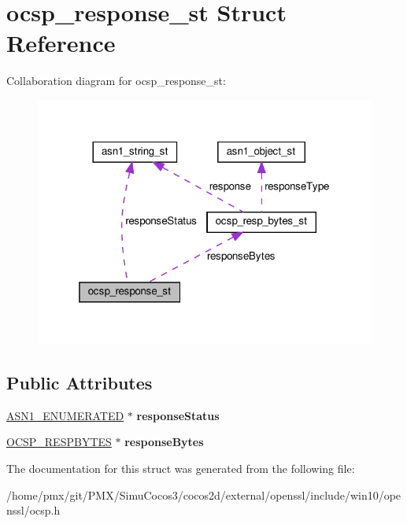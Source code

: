 \hypertarget{structocsp__response__st}{}\section{ocsp\+\_\+response\+\_\+st Struct Reference}
\label{structocsp__response__st}


Collaboration diagram for ocsp\+\_\+response\+\_\+st\+:
\nopagebreak
\begin{figure}[H]
\begin{center}
\leavevmode
\includegraphics[width=319pt]{structocsp__response__st__coll__graph}
\end{center}
\end{figure}
\subsection*{Public Attributes}
\begin{DoxyCompactItemize}
\item 
\mbox{\label{structocsp__response__st_a5c79d6dd4c93fb0946fc1e94467589fe}} 
\hyperlink{structasn1__string__st}{A\+S\+N1\+\_\+\+E\+N\+U\+M\+E\+R\+A\+T\+ED} $\ast$ {\bfseries response\+Status}
\item 
\mbox{\label{structocsp__response__st_a4724a80cc511a45789534e55588e5b9c}} 
\hyperlink{structocsp__resp__bytes__st}{O\+C\+S\+P\+\_\+\+R\+E\+S\+P\+B\+Y\+T\+ES} $\ast$ {\bfseries response\+Bytes}
\end{DoxyCompactItemize}


The documentation for this struct was generated from the following file\+:\begin{DoxyCompactItemize}
\item 
/home/pmx/git/\+P\+M\+X/\+Simu\+Cocos3/cocos2d/external/openssl/include/win10/openssl/ocsp.\+h\end{DoxyCompactItemize}
